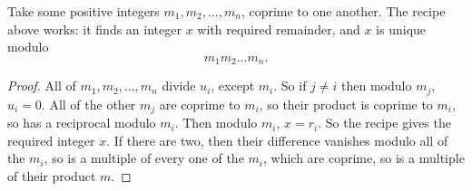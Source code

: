 \begin{theorem}
Take some positive integers \(m_1, m_2, \dots, m_n\), coprime to one another.
The recipe above works: it finds an integer \(x\) with required remainder, and \(x\) is unique modulo 
\[
m_1 m_2 \dots m_n.
\]
\end{theorem}
\begin{proof}
All of \(m_1, m_2, \dots, m_n\) divide \(u_i\), except \(m_i\).
So if \(j \ne i\) then modulo \(m_j\), \(u_i=0\).
All of the other \(m_j\) are coprime to \(m_i\), so their product is coprime to \(m_i\), so has a reciprocal modulo \(m_i\).
Then modulo \(m_i\), \(x=r_i\).
So the recipe gives the required integer \(x\).
If there are two, then their difference vanishes modulo all of the \(m_i\), so is a multiple of every one of the \(m_i\), which are coprime, so is a multiple of their product \(m\).
\end{proof}
